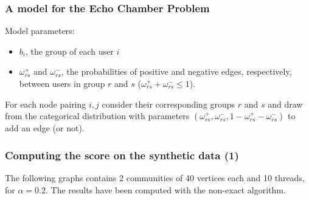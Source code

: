 \documentclass{beamer}
\begin{document}
\begin{frame}[c]
	\frametitle{A model for the Echo Chamber Problem}
	Model parameters:
	\begin{itemize}
		\item $b_{i} $, the group of each user $i$
		\item $\omega ^{+} _{rs} $ and $\omega ^{-} _{rs} $, the probabilities
		      of positive and negative edges, respectively, between users in
		      group $r$ and $s$ ($\omega ^{+} _{rs} + \omega ^{-} _{rs} \leq 1$).
	\end{itemize}

	For each node pairing $i, j$ consider their corresponding groups $r$ and
	$s$ and draw from the categorical distribution with parameters $(\omega _{rs} ^{+}, \omega
		_{rs} ^{-}, 1 - \omega _{rs} ^{+} - \omega _{rs} ^{-}) $ to add an edge (or
	not).
\end{frame}


\begin{frame}[c]
	\frametitle{Computing the score on the synthetic data (1)}

	The following graphs contains 2 communities of 40 vertices each and 10
	threads, for $\alpha = 0.2$. The results have been computed with the
	non-exact algorithm.
\end{frame}
\end{document}
